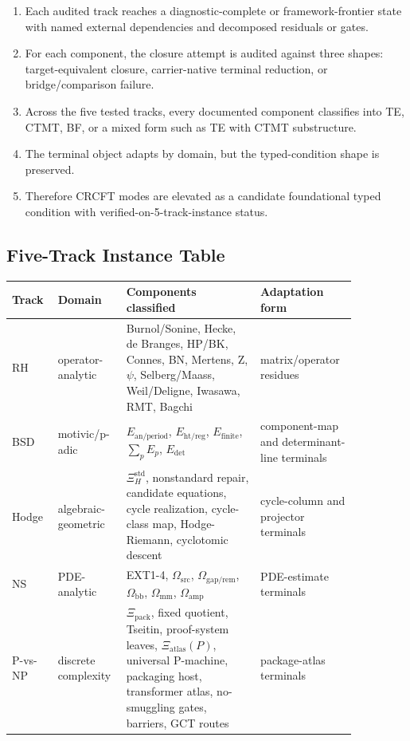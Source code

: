 \begin{enumerate}
  \item Each audited track reaches a diagnostic-complete or framework-frontier state with named external dependencies and decomposed residuals or gates.
  \item For each component, the closure attempt is audited against three shapes: target-equivalent closure, carrier-native terminal reduction, or bridge/comparison failure.
  \item Across the five tested tracks, every documented component classifies into TE, CTMT, BF, or a mixed form such as TE with CTMT substructure.
  \item The terminal object adapts by domain, but the typed-condition shape is preserved.
  \item Therefore CRCFT modes are elevated as a candidate foundational typed condition with verified-on-5-track-instance status.
\end{enumerate}

\subsection*{Five-Track Instance Table}

\begin{tabular}{p{0.12\linewidth}p{0.16\linewidth}p{0.36\linewidth}p{0.22\linewidth}}
\hline
Track & Domain & Components classified & Adaptation form \\
\hline
RH & operator-analytic & Burnol/Sonine, Hecke, de Branges, HP/BK, Connes, BN, Mertens, Z, $\psi$, Selberg/Maass, Weil/Deligne, Iwasawa, RMT, Bagchi & matrix/operator residues \\
BSD & motivic/p-adic & $E_{\mathrm{an/period}}$, $E_{\mathrm{ht/reg}}$, $E_{\mathrm{finite}}$, $\sum_p E_p$, $E_{\mathrm{det}}$ & component-map and determinant-line terminals \\
Hodge & algebraic-geometric & $\Xi_H^{\mathrm{std}}$, nonstandard repair, candidate equations, cycle realization, cycle-class map, Hodge-Riemann, cyclotomic descent & cycle-column and projector terminals \\
NS & PDE-analytic & EXT1-4, $\Omega_{\mathrm{src}}$, $\Omega_{\mathrm{gap/rem}}$, $\Omega_{\mathrm{bb}}$, $\Omega_{\mathrm{mm}}$, $\Omega_{\mathrm{amp}}$ & PDE-estimate terminals \\
P-vs-NP & discrete complexity & $\Xi_{\mathrm{pack}}$, fixed quotient, Tseitin, proof-system leaves, $\Xi_{\mathrm{atlas}}(P)$, universal P-machine, packaging host, transformer atlas, no-smuggling gates, barriers, GCT routes & package-atlas terminals \\
\hline
\end{tabular}

